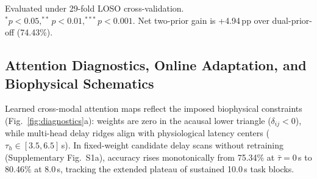\documentclass[journal]{IEEEtran}
\begin{document}
\begin{table}[!t]
\centering
\caption{Ablation analysis and $2 \times 2$ factorial decomposition of delay prior $\mathbf{P}$ and causal mask $\mathbf{M}$ on the TU Berlin benchmark.}
\label{tab:ablation}
\par\smallskip
{\scriptsize Evaluated under 29-fold LOSO cross-validation. $^{*}p<0.05, ^{**}p<0.01, ^{***}p<0.001$. Net two-prior gain is +4.94\,pp over dual-prior-off (74.43\%).}
\end{table}


\subsection{Attention Diagnostics, Online Adaptation, and Biophysical Schematics}
Learned cross-modal attention maps reflect the imposed biophysical constraints (Fig.~\ref{fig:diagnostics}a): weights are zero in the acausal lower triangle ($\delta_{ij} < 0$), while multi-head delay ridges align with physiological latency centers ($\tau_h \in [3.5, 6.5]$\,s). In fixed-weight candidate delay scans without retraining (Supplementary Fig.~S1a), accuracy rises monotonically from 75.34\% at $\bar{\tau} = 0$\,s to 80.46\% at 8.0\,s, tracking the extended plateau of sustained 10.0\,s task blocks.
\end{document}
